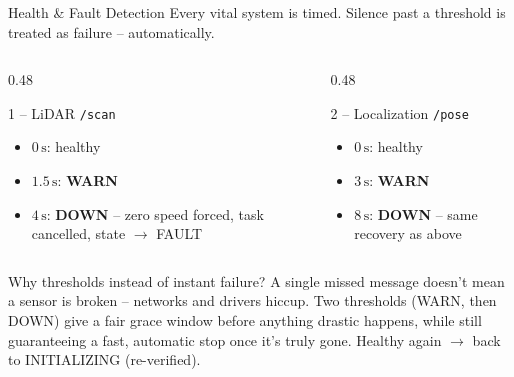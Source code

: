 \documentclass[aspectratio=169, 11pt]{beamer}
\begin{document}
\begin{frame}{Health \& Fault Detection} 
  \small
  Every vital system is timed. Silence past a threshold is treated as failure -- automatically.
  \vspace{0.25cm}
  \begin{columns}[T]
    \begin{column}{0.48\textwidth}
      \begin{block}{1 -- LiDAR \texttt{/scan}}
        \footnotesize
        \begin{itemize}
          \item $0\,\mathrm{s}$: healthy
          \item $1.5\,\mathrm{s}$: \textcolor{orange!80!black}{\textbf{WARN}}
          \item $4\,\mathrm{s}$: \textcolor{accentred}{\textbf{DOWN}} -- zero speed forced, task cancelled, state $\rightarrow$ FAULT
        \end{itemize}
      \end{block}
    \end{column}
    \begin{column}{0.48\textwidth}
      \begin{block}{2 -- Localization \texttt{/pose}}
        \footnotesize
        \begin{itemize}
          \item $0\,\mathrm{s}$: healthy
          \item $3\,\mathrm{s}$: \textcolor{orange!80!black}{\textbf{WARN}}
          \item $8\,\mathrm{s}$: \textcolor{accentred}{\textbf{DOWN}} -- same recovery as above
        \end{itemize}
      \end{block}
    \end{column}
  \end{columns}
  \vspace{0.25cm}
  \begin{block}{Why thresholds instead of instant failure?}
    \footnotesize
    A single missed message doesn't mean a sensor is broken -- networks and drivers hiccup. Two thresholds (WARN, then DOWN) give a fair grace window before anything drastic happens, while still guaranteeing a fast, automatic stop once it's truly gone. Healthy again $\rightarrow$ back to INITIALIZING (re-verified).
  \end{block}
\end{frame}
\end{document}
